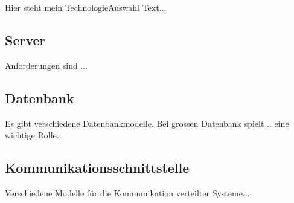 Hier steht mein TechnologieAuswahl Text...


\subsection{Server}
Anforderungen sind ...


\subsection{Datenbank}
Es gibt verschiedene Datenbankmodelle. Bei grossen Datenbank spielt .. eine wichtige Rolle..

\subsection{Kommunikationsschnittstelle}
Verschiedene Modelle für die Kommunikation verteilter Systeme...

